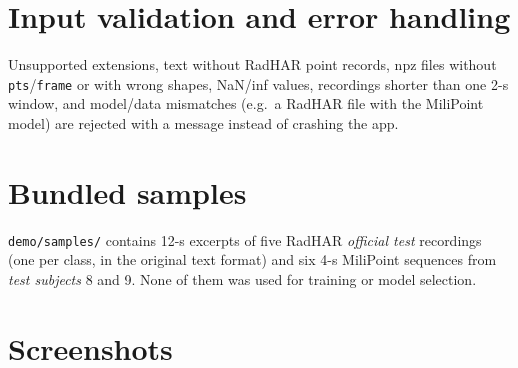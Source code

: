 \section{Input validation and error handling}
Unsupported extensions, text without RadHAR point records, npz files without
\texttt{pts}/\texttt{frame} or with wrong shapes, NaN/inf values, recordings
shorter than one 2-s window, and model/data mismatches (e.g.\ a RadHAR file with
the MiliPoint model) are rejected with a message instead of crashing the app.

\section{Bundled samples}
\texttt{demo/samples/} contains 12-s excerpts of five RadHAR \emph{official test}
recordings (one per class, in the original text format) and six 4-s MiliPoint
sequences from \emph{test subjects} 8 and 9. None of them was used for training
or model selection.

\section{Screenshots}

